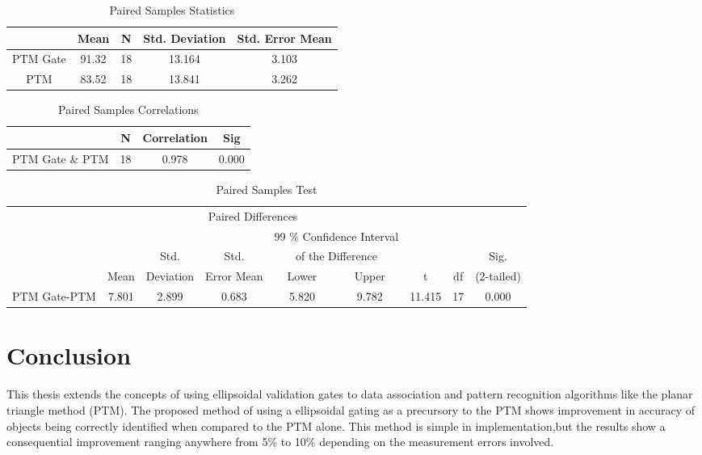 \documentclass[]{aiaa-tc}%
\begin{document}
\begin{table}[h]
\centering
\begin{tabular}{|c|c|c|c|c|}
\toprule
 & Mean & N & Std. Deviation & Std. Error Mean\\ \hline
PTM Gate & 91.32 & 18 & 13.164 & 3.103\\
PTM & 83.52 & 18 & 13.841 & 3.262\\  
\bottomrule
\end{tabular}%
\caption{Paired Samples Statistics}
\label{table:PS_Statistics}%
\end{table}%

\begin{table}[h]
\centering
\begin{tabular}{|c|c|c|c|}
\toprule
 & N & Correlation & Sig\\ \hline
PTM Gate \& PTM & 18 & 0.978 & 0.000\\ 
\bottomrule
\end{tabular}%
\caption{Paired Samples Correlations}
\label{table:PS_Correlations}%
\end{table}%


\begin{table}[h!]
\centering
\begin{tabular}{|c|c|c|c|c|c|c|c|c|}
\toprule
 & \multicolumn{5}{|c|}{Paired Differences} & & &\\ \cline{2-6}
 & & & & \multicolumn{2}{|c|}{99 \% Confidence Interval} & & &\\
 & &  Std.  & Std.  & \multicolumn{2}{|c|}{of the Difference} & & & Sig.\\ \cline{5-6}
 & Mean & Deviation & Error Mean & Lower & Upper & t & df & (2-tailed) \\ \cline{1-9}
PTM Gate-PTM & 7.801 & 2.899 & 0.683 & 5.820 & 9.782 & 11.415 & 17    & 0.000 \\
\bottomrule
\end{tabular}%
\caption{Paired Samples Test}
\label{tab:PS test}%
\end{table}%


\section{Conclusion}

This thesis extends the concepts of using ellipsoidal validation gates to data association and pattern recognition algorithms like the planar triangle method (PTM). The proposed method of using a ellipsoidal gating as a precursory to the PTM shows improvement in accuracy of objects being correctly identified when compared to the PTM alone. This method is simple in implementation,but the results show a consequential improvement ranging anywhere from 5\% to 10\% depending on the measurement errors involved.
\end{document}
